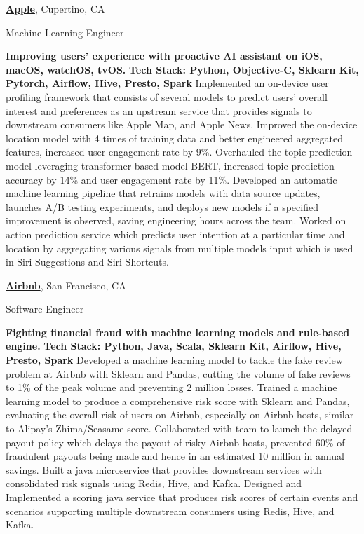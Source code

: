 \documentclass[a4paper,MMMyyyy,nonstopmode]{simpleresumecv}
\begin{document}
\begin{Body}
\BigGap
\Entry
\href{https://www.apple.com/}
{\textbf{Apple}},
Cupertino, CA

\Gap
\BulletItem
Machine Learning Engineer
\hfill
{} --
\begin{Detail}
\SubBulletItem
\textbf{Improving users' experience with proactive AI assistant on iOS, macOS, watchOS, tvOS.}
\SubBulletItem \textbf{Tech Stack: Python, Objective-C, Sklearn Kit, Pytorch, Airflow, Hive, Presto, Spark}
\SubBulletItem
Implemented an on-device user profiling framework that consists of several models to predict users' overall interest and preferences as an upstream service that provides signals to downstream consumers like Apple Map, and Apple News.
\SubBulletItem
Improved the on-device location model with 4 times of training data and better engineered aggregated features, increased user engagement rate by 9\%.
\SubBulletItem
Overhauled the topic prediction model leveraging transformer-based model BERT, increased topic prediction accuracy by 14\% and user engagement rate by 11\%.
\SubBulletItem
Developed an automatic machine learning pipeline that retrains models with data source updates, launches A/B testing experiments, and deploys new models if a specified improvement is observed, saving engineering hours across the team.
\SubBulletItem
Worked on action prediction service which predicts user intention at a particular time and location by aggregating various signals from multiple models input which is used in Siri Suggestions and Siri Shortcuts.
\end{Detail}

\BigGap
\Entry
\href{https://press.airbnb.com/about-us/}
{\textbf{Airbnb}},
San Francisco, CA

\Gap
\BulletItem
Software Engineer
\hfill
{} --
\begin{Detail}
\SubBulletItem
\textbf{Fighting financial fraud with machine learning models and rule-based engine.}
\SubBulletItem \textbf{Tech Stack: Python, Java, Scala, Sklearn Kit, Airflow, Hive, Presto, Spark}
\SubBulletItem
Developed a machine learning model to tackle the fake review problem at Airbnb with Sklearn and Pandas, cutting the volume of fake reviews to 1\% of the peak volume and preventing 2 million losses.
\SubBulletItem
Trained a machine learning model to produce a comprehensive risk score with Sklearn and Pandas, evaluating the overall risk of users on Airbnb, especially on Airbnb hosts, similar to Alipay's Zhima/Seasame score.
\SubBulletItem
Collaborated with team to launch the delayed payout policy which delays the payout of risky Airbnb hosts, prevented 60\% of fraudulent payouts being made and hence in an estimated 10 million in annual savings.
\SubBulletItem
Built a java microservice that provides downstream services with consolidated risk signals using Redis, Hive, and Kafka.
\SubBulletItem
Designed and Implemented a scoring java service that produces risk scores of certain events and scenarios supporting multiple downstream consumers using Redis, Hive, and Kafka.
\end{Detail}


\end{Body}
\end{document}
